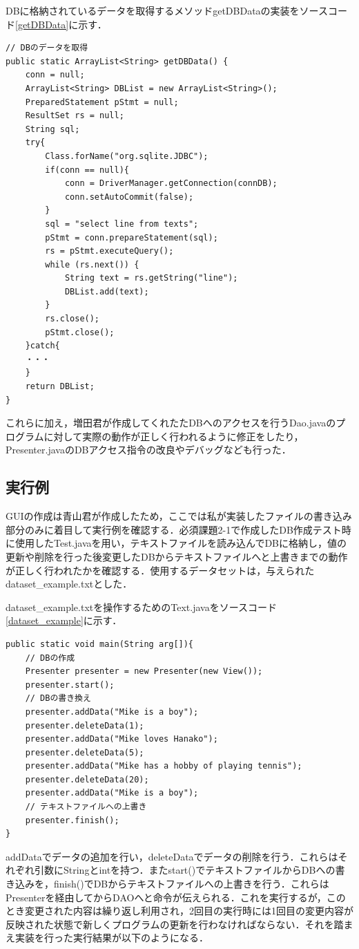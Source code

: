\documentclass[12pt]{jarticle}
\begin{document}
DBに格納されているデータを取得するメソッドgetDBDataの実装をソースコード\ref{getDBData}に示す．
\begin{lstlisting}[caption=getDBDataメソッド,label=getDBData]
// DBのデータを取得
public static ArrayList<String> getDBData() {
	conn = null;
	ArrayList<String> DBList = new ArrayList<String>();
	PreparedStatement pStmt = null;
	ResultSet rs = null;
	String sql;
	try{
		Class.forName("org.sqlite.JDBC");
		if(conn == null){
			conn = DriverManager.getConnection(connDB);
			conn.setAutoCommit(false);
		}
		sql = "select line from texts";
		pStmt = conn.prepareStatement(sql);
		rs = pStmt.executeQuery();
		while (rs.next()) {
			String text = rs.getString("line");
			DBList.add(text);
		}
		rs.close();
		pStmt.close();
	}catch{
	・・・
	}
	return DBList;
}
\end{lstlisting}

これらに加え，増田君が作成してくれたたDBへのアクセスを行うDao.javaのプログラムに対して実際の動作が正しく行われるように修正をしたり，Presenter.javaのDBアクセス指令の改良やデバッグなども行った．

\subsection{実行例}
GUIの作成は青山君が作成したため，ここでは私が実装したファイルの書き込み部分のみに着目して実行例を確認する．必須課題2-1で作成したDB作成テスト時に使用したTest.javaを用い，テキストファイルを読み込んでDBに格納し，値の更新や削除を行った後変更したDBからテキストファイルへと上書きまでの動作が正しく行われたかを確認する．使用するデータセットは，与えられたdataset\_example.txtとした．

dataset\_example.txtを操作するためのText.javaをソースコード\ref{dataset_example}に示す．
\begin{lstlisting}[caption=Text.javaのmainメソッド,label=dataset_example]
public static void main(String arg[]){
	// DBの作成
	Presenter presenter = new Presenter(new View());
	presenter.start();
	// DBの書き換え
	presenter.addData("Mike is a boy");
	presenter.deleteData(1);
	presenter.addData("Mike loves Hanako");
	presenter.deleteData(5);
	presenter.addData("Mike has a hobby of playing tennis");
	presenter.deleteData(20);
	presenter.addData("Mike is a boy");
	// テキストファイルへの上書き
	presenter.finish();
}
\end{lstlisting}

addDataでデータの追加を行い，deleteDataでデータの削除を行う．これらはそれぞれ引数にStringとintを持つ．またstart()でテキストファイルからDBへの書き込みを，finish()でDBからテキストファイルへの上書きを行う．これらはPresenterを経由してからDAOへと命令が伝えられる．これを実行するが，このとき変更された内容は繰り返し利用され，2回目の実行時には1回目の変更内容が反映された状態で新しくプログラムの更新を行わなければならない．それを踏まえ実装を行った実行結果が以下のようになる．\\
\end{document}
